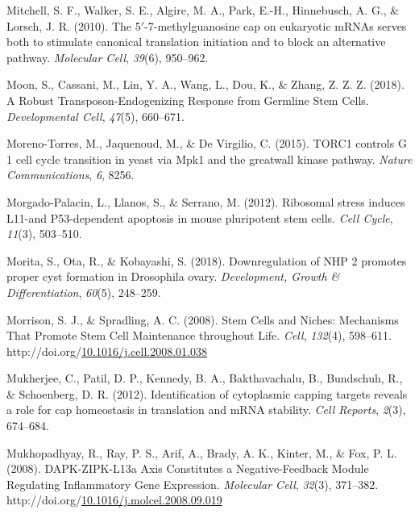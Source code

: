 \documentclass[12pt,oneside]{reedthesis}
\newlength{\cslhangindent}
\newenvironment{CSLReferences}[2] %
 {%
  \setlength{\parindent}{0pt}
  \ifodd #1 \everypar{\setlength{\hangindent}{\cslhangindent}}\ignorespaces\fi
  \ifnum #2 > 0
  \setlength{\parskip}{#2\baselineskip}
  \fi
 }%
 {}
\begin{document}
\begin{CSLReferences}{1}{0}
\leavevmode{}%
Mitchell, S. F., Walker, S. E., Algire, M. A., Park, E.-H., Hinnebusch, A. G., \& Lorsch, J. R. (2010). The 5{\({'}\)}-7-methylguanosine cap on eukaryotic {mRNAs} serves both to stimulate canonical translation initiation and to block an alternative pathway. \emph{Molecular Cell}, \emph{39}(6), 950--962.

\leavevmode{}%
Moon, S., Cassani, M., Lin, Y. A., Wang, L., Dou, K., \& Zhang, Z. Z. Z. (2018). A {Robust Transposon-Endogenizing Response} from {Germline Stem Cells}. \emph{Developmental Cell}, \emph{47}(5), 660--671.

\leavevmode{}%
Moreno-Torres, M., Jaquenoud, M., \& De Virgilio, C. (2015). {TORC1} controls {G} 1 cell cycle transition in yeast via {Mpk1} and the greatwall kinase pathway. \emph{Nature Communications}, \emph{6}, 8256.

\leavevmode{}%
Morgado-Palacin, L., Llanos, S., \& Serrano, M. (2012). Ribosomal stress induces {L11-and} P53-dependent apoptosis in mouse pluripotent stem cells. \emph{Cell Cycle}, \emph{11}(3), 503--510.

\leavevmode{}%
Morita, S., Ota, R., \& Kobayashi, S. (2018). Downregulation of {NHP} 2 promotes proper cyst formation in {Drosophila} ovary. \emph{Development, Growth \& Differentiation}, \emph{60}(5), 248--259.

\leavevmode{}%
Morrison, S. J., \& Spradling, A. C. (2008). Stem {Cells} and {Niches}: {Mechanisms That Promote Stem Cell Maintenance} throughout {Life}. \emph{Cell}, \emph{132}(4), 598--611. http://doi.org/\href{https://doi.org/10.1016/j.cell.2008.01.038}{10.1016/j.cell.2008.01.038}

\leavevmode{}%
Mukherjee, C., Patil, D. P., Kennedy, B. A., Bakthavachalu, B., Bundschuh, R., \& Schoenberg, D. R. (2012). Identification of cytoplasmic capping targets reveals a role for cap homeostasis in translation and {mRNA} stability. \emph{Cell Reports}, \emph{2}(3), 674--684.

\leavevmode{}%
Mukhopadhyay, R., Ray, P. S., Arif, A., Brady, A. K., Kinter, M., \& Fox, P. L. (2008). {DAPK-ZIPK-L13a Axis Constitutes} a {Negative-Feedback Module Regulating Inflammatory Gene Expression}. \emph{Molecular Cell}, \emph{32}(3), 371--382. http://doi.org/\href{https://doi.org/10.1016/j.molcel.2008.09.019}{10.1016/j.molcel.2008.09.019}


\end{CSLReferences}
\end{document}
